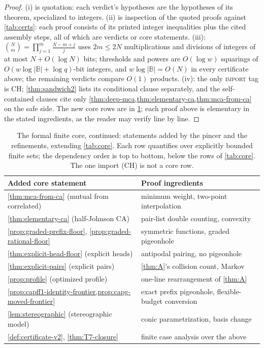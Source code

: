 \documentclass[11pt]{article}
\theoremstyle{definition}
\theoremstyle{remark}
\newcommand{\B}{\mathbb{B}}
\begin{document}
\begin{proof}
(i) is quotation: each verdict's hypotheses are the hypotheses of its theorem, specialized to integers. (ii) is inspection of the quoted proofs against \cref{tab:certs}: each proof consists of its printed integer inequalities plus the cited assembly steps, all of which are verdicts or core statements. (iii): $\binom Nm=\prod_{j=1}^m\frac{N-m+j}j$ uses $2m\le2N$ multiplications and divisions of integers of at most $N+O(\log N)$ bits; thresholds and powers are $O(\log w)$ squarings of $O(w\log|\B|+\log q)$-bit integers, and $w\log|\B|=O(N)$ in every certificate above; the remaining verdicts compare $O(1)$ products. (iv): the only \textup{\textsc{import}} tag is CH; \cref{thm:sandwich2} lists its conditional clause separately, and the self-contained clauses cite only \cref{thm:deep-mca,thm:elementary-ca,thm:mca-from-ca} on the safe side. The new core rows are in \cref{tab:core2}; each proof above is elementary in the stated ingredients, as the reader may verify line by line.
\end{proof}

\begin{table}[ht]
\centering
\small
\begin{tabular}{@{}ll@{}}
\toprule
Added core statement & Proof ingredients \\
\midrule
\cref{thm:mca-from-ca} \textup(mutual from correlated\textup) & minimum weight, two-point interpolation \\
\cref{thm:elementary-ca} \textup(half-Johnson CA\textup) & pair-list double counting, convexity \\
\cref{prop:graded-prefix-floor}, \cref{prop:graded-rational-floor} & symmetric functions, graded pigeonhole \\
\cref{thm:explicit-head-floor} \textup(explicit heads\textup) & antipodal pairing, no pigeonhole \\
\cref{thm:explicit-pairs} \textup(explicit pairs\textup) & \cref{thm:A}'s collision count, Markov \\
\cref{prop:profile} \textup(optimized profile\textup) & one-line rearrangement of \cref{thm:A} \\
\cref{prop:capff1-identity-frontier,prop:capg-moved-frontier} & exact prefix pigeonhole, flexible-budget conversion \\
\cref{lem:stereographic} \textup(stereographic model\textup) & conic parametrization, basis change \\
\cref{def:certificate-v2}, \cref{thm:T7-closure} & finite case analysis over the above \\
\bottomrule
\end{tabular}
\caption{The formal finite core, continued: statements added by the pincer and the refinements, extending \cref{tab:core}. Each row quantifies over explicitly bounded finite sets; the dependency order is top to bottom, below the rows of \cref{tab:core}. The one import (\textsc{CH}) is not a core row.}
\label{tab:core2}
\end{table}
\end{document}
